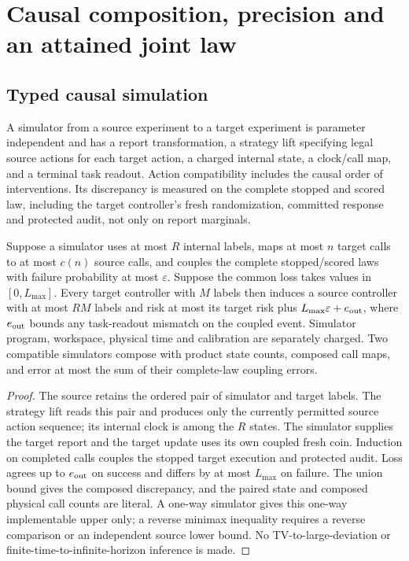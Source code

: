 \section{Causal composition, precision and an attained joint law}\label{sec:resources}
\subsection{Typed causal simulation}
A simulator from a source experiment to a target experiment is parameter independent and has a report transformation, a strategy lift specifying legal source actions for each target action, a charged internal state, a clock/call map, and a terminal task readout. Action compatibility includes the causal order of interventions. Its discrepancy is measured on the complete stopped and scored law, including the target controller's fresh randomization, committed response and protected audit, not only on report marginals.

\begin{proposition}\label{prop:simulation}
Suppose a simulator uses at most $R$ internal labels, maps at most $n$ target calls to at most $c(n)$ source calls, and couples the complete stopped/scored laws with failure probability at most $\varepsilon$. Suppose the common loss takes values in $[0,L_{\max}]$. Every target controller with $M$ labels then induces a source controller with at most $RM$ labels and risk at most its target risk plus $L_{\max}\varepsilon+e_{\rm out}$, where $e_{\rm out}$ bounds any task-readout mismatch on the coupled event. Simulator program, workspace, physical time and calibration are separately charged. Two compatible simulators compose with product state counts, composed call maps, and error at most the sum of their complete-law coupling errors.
\end{proposition}
\begin{proof}
The source retains the ordered pair of simulator and target labels. The strategy lift reads this pair and produces only the currently permitted source action sequence; its internal clock is among the $R$ states. The simulator supplies the target report and the target update uses its own coupled fresh coin. Induction on completed calls couples the stopped target execution and protected audit. Loss agrees up to $e_{\rm out}$ on success and differs by at most $L_{\max}$ on failure. The union bound gives the composed discrepancy, and the paired state and composed physical call counts are literal. A one-way simulator gives this one-way implementable upper only; a reverse minimax inequality requires a reverse comparison or an independent source lower bound. No TV-to-large-deviation or finite-time-to-infinite-horizon inference is made.
\end{proof}

